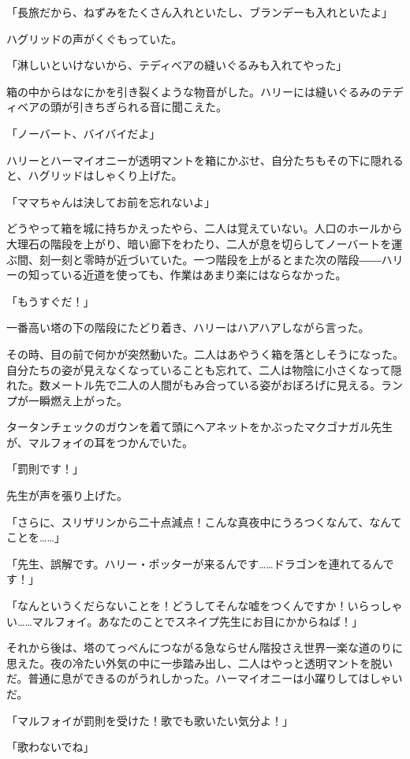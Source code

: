 \documentclass[10pt,a4paper]{article}
\begin{document}
\begin{CJK}{UTF8}{min}
「長旅だから、ねずみをたくさん入れといたし、ブランデーも入れといたよ」

ハグリッドの声がくぐもっていた。

「淋しいといけないから、テディベアの縫いぐるみも入れてやった」

箱の中からはなにかを引き裂くような物音がした。ハリーには縫いぐるみのテディベアの頭が引きちぎられる音に聞こえた。

「ノーバート、バイバイだよ」

ハリーとハーマイオニーが透明マントを箱にかぶせ、自分たちもその下に隠れると、ハグリッドはしゃくり上げた。

「ママちゃんは決してお前を忘れないよ」

どうやって箱を城に持ちかえったやら、二人は覚えていない。人口のホールから大理石の階段を上がり、暗い廊下をわたり、二人が息を切らしてノーバートを運ぶ間、刻一刻と零時が近づいていた。一つ階段を上がるとまた次の階段――ハリーの知っている近道を使っても、作業はあまり楽にはならなかった。

「もうすぐだ！」

一番高い塔の下の階段にたどり着き、ハリーはハアハアしながら言った。

その時、目の前で何かが突然動いた。二人はあやうく箱を落としそうになった。自分たちの姿が見えなくなっていることも忘れて、二人は物陰に小さくなって隠れた。数メートル先で二人の人間がもみ合っている姿がおぼろげに見える。ランプが一瞬燃え上がった。

タータンチェックのガウンを着て頭にヘアネットをかぶったマクゴナガル先生が、マルフォイの耳をつかんでいた。

「罰則です！」

先生が声を張り上げた。

「さらに、スリザリンから二十点減点！こんな真夜中にうろつくなんて、なんてことを……」

「先生、誤解です。ハリー・ポッターが来るんです……ドラゴンを連れてるんです！」

「なんというくだらないことを！どうしてそんな嘘をつくんですか！いらっしゃい……マルフォイ。あなたのことでスネイプ先生にお目にかからねば！」

それから後は、塔のてっぺんにつながる急ならせん階投さえ世界一楽な道のりに思えた。夜の冷たい外気の中に一歩踏み出し、二人はやっと透明マントを脱いだ。普通に息ができるのがうれしかった。ハーマイオニーは小躍りしてはしゃいだ。

「マルフォイが罰則を受けた！歌でも歌いたい気分よ！」

「歌わないでね」


\end{CJK}
\end{document}

